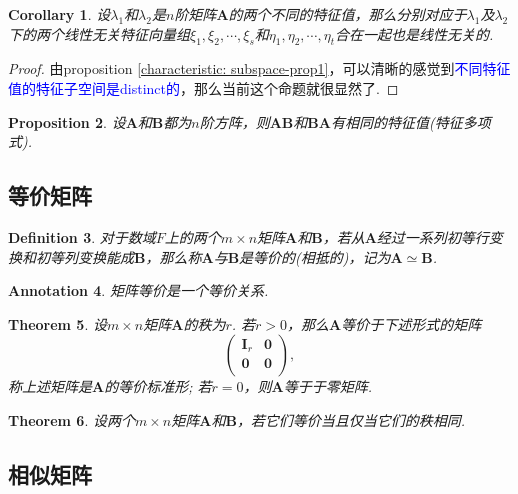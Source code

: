 \documentclass{article}
\newtheorem{theorem}{Theorem}[section]
\newtheorem{corollary}[theorem]{Corollary}
\newtheorem{proposition}[theorem]{Proposition}
\newtheorem{definition}[theorem]{Definition}
\newtheorem{annotation}[theorem]{Annotation}
\newcommand{\mbf}[1]{\bm{#1}}
\newcommand{\bluet}[1]{\textcolor{blue}{#1}}
\begin{document}
\begin{corollary}\label{characteristic: subspace-prop2}
\rm 设$\lambda_1$和$\lambda_2$是$n$阶矩阵$\mbf{A}$的两个不同的特征值，那么分别对应于$\lambda_1$及$\lambda_2$下的两个线性无关特征向量组$\xi_1,\xi_2,\cdots,\xi_s$和$\eta_1,\eta_2,\cdots,\eta_t$合在一起也是线性无关的.
\end{corollary}

\begin{proof}
由proposition \ref{characteristic: subspace-prop1}，可以清晰的感觉到\bluet{不同特征值的特征子空间是distinct的}，那么当前这个命题就很显然了. 
\end{proof}

\begin{proposition}
\rm 设$\mbf{A}$和$\mbf{B}$都为$n$阶方阵，则$\mbf{AB}$和$\mbf{BA}$有相同的特征值(特征多项式).
\end{proposition}


\newpage
\subsection{等价矩阵}

\begin{definition}
\rm 对于数域$F$上的两个$m\times n$矩阵$\mbf{A}$和$\mbf{B}$，若从$\mbf{A}$经过一系列初等行变换和初等列变换能成$\mbf{B}$，那么称$\mbf{A}$与$\mbf{B}$是等价的(相抵的)，记为$\mbf{A} \simeq \mbf{B}$.
\end{definition}

\begin{annotation}
\rm 矩阵等价是一个等价关系. 
\end{annotation}

\begin{theorem}
\rm 设$m\times n$矩阵$\mbf{A}$的秩为$r$. 若$r > 0$，那么$\mbf{A}$等价于下述形式的矩阵
$$
\begin{pmatrix}
\mbf{I}_r & \mbf{0} \\
\mbf{0} & \mbf{0} \\
\end{pmatrix},
$$
称上述矩阵是$\mbf{A}$的等价标准形; 若$r=0$，则$\mbf{A}$等于于零矩阵.
\end{theorem}

\begin{theorem}
\rm 设两个$m\times n$矩阵$\mbf{A}$和$\mbf{B}$，若它们等价当且仅当它们的秩相同.
\end{theorem}


\newpage
\subsection{相似矩阵}
\end{document}
